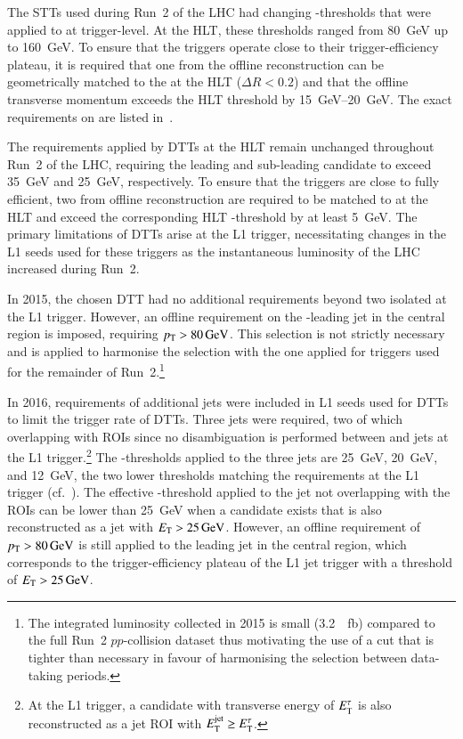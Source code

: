 The STTs used during Run~2 of the LHC had changing \pT-thresholds that
were applied to \tauhadvis at trigger-level. At the HLT, these
thresholds ranged from \SI{80}{\GeV} up to \SI{160}{\GeV}. To ensure
that the triggers operate close to their trigger-efficiency plateau,
it is required that one \tauhadvis from the offline reconstruction can
be geometrically matched to the \tauhadvis at the HLT
($\Delta R < 0.2$) and that the offline \tauhadvis transverse momentum
exceeds the HLT threshold by \SIrange{15}{20}{\GeV}. The exact
requirements on \tauhadvis are listed in~.

The \tauhadvis \pT requirements applied by DTTs at the HLT remain
unchanged throughout Run~2 of the LHC, requiring the leading and
sub-leading \tauhadvis candidate \pT to exceed \SI{35}{\GeV} and
\SI{25}{\GeV}, respectively. To ensure that the triggers are close to
fully efficient, two \tauhadvis from offline reconstruction are
required to be matched to \tauhadvis at the HLT and exceed the
corresponding HLT \pT-threshold by at least \SI{5}{\GeV}. The primary
limitations of DTTs arise at the L1 trigger, necessitating changes in
the L1 seeds used for these triggers as the instantaneous luminosity
of the LHC increased during Run~2.

In 2015, the chosen DTT had no additional requirements beyond two
isolated \tauhadvis at the L1 trigger. However, an offline requirement
on the \pT-leading jet in the central region is imposed, requiring
$\pT > \SI{80}{\GeV}$. This selection is not strictly necessary and is
applied to harmonise the selection with the one applied for triggers
used for the remainder of Run~2.\footnote{The integrated luminosity
  collected in 2015 is small (\SI{3.2}{\per\femto\barn}) compared to
  the full Run~2 $pp$-collision dataset thus motivating the use of a
  cut that is tighter than necessary in favour of harmonising the
  selection between data-taking periods.}

In 2016, requirements of additional jets were included in L1 seeds
used for DTTs to limit the trigger rate of DTTs. Three jets were
required, two of which overlapping with \tauhadvis ROIs since no
disambiguation is performed between \tauhadvis and jets at the L1
trigger.\footnote{At the L1 trigger, a \tauhadvis candidate with
  transverse energy of $E_{\text{T}}^\tau$ is also reconstructed as a jet ROI
  with $E_{\text{T}}^{\text{jet}} \geq E_{\text{T}}^\tau$.}  The \ET-thresholds applied
to the three jets are \SI{25}{\GeV}, \SI{20}{\GeV}, and \SI{12}{\GeV},
the two lower thresholds matching the \tauhadvis requirements at the
L1 trigger (cf.\ ). The effective
\ET-threshold applied to the jet not overlapping with the \tauhadvis
ROIs can be lower than \SI{25}{\GeV} when a \tauhadvis candidate
exists that is also reconstructed as a jet with $E_{\text{T}} >
\SI{25}{\ensuremath{\text{GeV}}}$. However, an offline requirement of
$\pT > \SI{80}{\GeV}$ is still applied to the leading jet in the
central region, which corresponds to the trigger-efficiency plateau of
the L1 jet trigger with a threshold of $E_{\text{T}} > \SI{25}{\ensuremath{\text{GeV}}}$.

